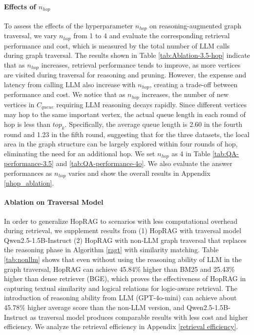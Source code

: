 \paragraph{Effects of $n_{hop}$} To assess the effects of the hyperparameter $n_{hop}$ on reasoning-augmented graph traversal, we vary $n_{hop}$ from 1 to 4 and evaluate the corresponding retrieval performance and cost, which is measured by the total number of LLM calls during graph traversal. The results shown in Table \ref{tab:Ablation-3.5-hop} indicate that as $n_{hop}$ increases, retrieval performance tends to improve, as more vertices are visited during traversal for reasoning and pruning. However, the expense and latency from calling LLM also increase with $n_{hop}$, creating a trade-off between performance and cost. We notice that as $n_{hop}$ increases, the number of new vertices in $C_{queue}$ requiring LLM reasoning decays rapidly. Since different vertices may hop to the same important vertex, the actual queue length in each round of hop is less than $top_k$. Specifically, the average queue length is 2.60 in the fourth round and 1.23 in the fifth round, suggesting that for the three datasets, the local area in the graph structure can be largely explored within four rounds of hop, eliminating the need for an additional hop. We set $n_{hop}$ as 4 in Table \ref{tab:QA-performance-3.5} and \ref{tab:QA-performance-4o}. We also evaluate the answer performances as $n_{hop}$ varies and show the overall results in Appendix \ref{nhop_ablation}.

\paragraph{Ablation on Traversal Model} 

In order to generalize HopRAG to scenarios with less computational overhead during retrieval, we supplement results from (1) HopRAG with traversal model Qwen2.5-1.5B-Instruct (2) HopRAG with non-LLM graph traversal that replaces the reasoning phase in Algorithm \ref{ragt} with similarity matching. Table \ref{tab:nonllm} shows that even without using the reasoning ability of LLM in the graph traversal, HopRAG can achieve 45.84\% higher than BM25 and 25.43\% higher than dense retriever (BGE), which proves the effectiveness of HopRAG in capturing textual similarity and logical relations for logic-aware retrieval.  The introduction of reasoning ability from LLM (GPT-4o-mini) can achieve about 45.78\% higher average score than the non-LLM version, and Qwen2.5-1.5B-Instruct as traversal model produces comparable results with less cost and higher efficiency. We analyze the retrieval efficiency in Appendix \ref{retrieval efficiency}.

